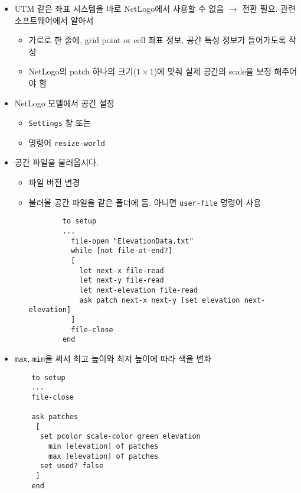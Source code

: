 \documentclass[hyperref={unicode}]{beamer}
\begin{document}
\begin{frame}[fragile]
\begin{itemize}
\item UTM 같은 좌표 시스템을 바로 NetLogo에서 사용할 수 없음 $\rightarrow$ 전환 필요. 관련 소프트웨어에서 알아서
	\begin{itemize}
	\item 가로로 한 줄에, grid point or cell 좌표 정보, 공간 특성 정보가 들어가도록 작성
	\item NetLogo의 patch 하나의 크기($1 \times 1$)에 맞춰 실제 공간의 scale을 보정 해주어야 함
	\end{itemize}
\item NetLogo 모델에서 공간 설정
	\begin{itemize}
	\item \verb|Settings| 창 또는
	\item 명령어 \verb|resize-world|
	\end{itemize}	
\end{itemize}	
\end{frame}

\begin{frame}[fragile]
\begin{itemize}
\item 공간 파일을 불러옵시다.
	\begin{itemize}
	\item 파일 버전 변경
	\item 불러올 공간 파일을 같은 폴더에 둠. 아니면 \verb|user-file| 명령어 사용
		\begin{verbatim}
		to setup
		...
		  file-open "ElevationData.txt"
		  while [not file-at-end?]
		  [
		    let next-x file-read
		    let next-y file-read
		    let next-elevation file-read
		    ask patch next-x next-y [set elevation next-elevation]
		  ]
		  file-close
		end
		\end{verbatim}
	\end{itemize}		
\end{itemize}	
\end{frame}

\begin{frame}[fragile]
\begin{itemize}
\item \verb|max|, \verb|min|을 써서 최고 높이와 최저 높이에 따라 색을 변화
	\begin{verbatim}
	to setup
	...
	file-close
		
	ask patches
	 [  
	  set pcolor scale-color green elevation 
	  	min [elevation] of patches 
		max [elevation] of patches
	  set used? false
	 ]
	end
	\end{verbatim}
\end{itemize}	
\end{frame}
\end{document}
